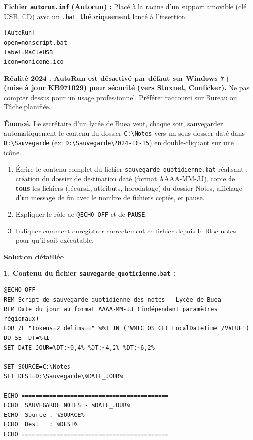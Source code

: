 \documentclass[11pt]{article}
\begin{document}
\begin{methode}
\textbf{Fichier \texttt{autorun.inf} (Autorun) :} Placé à la racine d'un support amovible (clé USB, CD) avec un \texttt{.bat}, \textbf{théoriquement} lancé à l'insertion.
\begin{lstlisting}
[AutoRun]
open=monscript.bat
label=MaCleUSB
icon=monicone.ico
\end{lstlisting}
\textbf{Réalité 2024 :} \textbf{AutoRun est désactivé par défaut sur Windows 7+ (mise à jour KB971029) pour sécurité (vers Stuxnet, Conficker).} Ne pas compter dessus pour un usage professionnel. Préférer raccourci sur Bureau ou Tâche planifiée.
\end{methode}

\begin{exoresolu}
\textbf{Énoncé.} Le secrétaire d'un lycée de Buea veut, chaque soir, sauvegarder automatiquement le contenu du dossier \texttt{C:\textbackslash Notes} vers un sous-dossier daté dans \texttt{D:\textbackslash Sauvegarde} (ex: \texttt{D:\textbackslash Sauvegarde\textbackslash 2024-10-15}) en double-cliquant sur une icône.
\begin{enumerate}
  \item Écrire le contenu complet du fichier \texttt{sauvegarde\_quotidienne.bat} réalisant : création du dossier de destination daté (format AAAA-MM-JJ), copie de \textbf{tous} les fichiers (récursif, attributs, horodatage) du dossier Notes, affichage d'un message de fin avec le nombre de fichiers copiés, et pause.
  \item Expliquer le rôle de \texttt{@ECHO OFF} et de \texttt{PAUSE}.
  \item Indiquer comment enregistrer correctement ce fichier depuis le Bloc-notes pour qu'il soit exécutable.
\end{enumerate}
\tcblower
\textbf{Solution détaillée.}

\textbf{1. Contenu du fichier \texttt{sauvegarde\_quotidienne.bat} :}
\begin{lstlisting}
@ECHO OFF
REM Script de sauvegarde quotidienne des notes - Lycée de Buea
REM Date du jour au format AAAA-MM-JJ (indépendant paramètres régionaux)
FOR /F "tokens=2 delims==" %%I IN ('WMIC OS GET LocalDateTime /VALUE') DO SET DT=%%I
SET DATE_JOUR=%DT:~0,4%-%DT:~4,2%-%DT:~6,2%

SET SOURCE=C:\Notes
SET DEST=D:\Sauvegarde\%DATE_JOUR%

ECHO ==========================================
ECHO  SAUVEGARDE NOTES - %DATE_JOUR%
ECHO  Source : %SOURCE%
ECHO  Dest   : %DEST%
ECHO ==========================================


\end{lstlisting}
\end{exoresolu}
\end{document}
